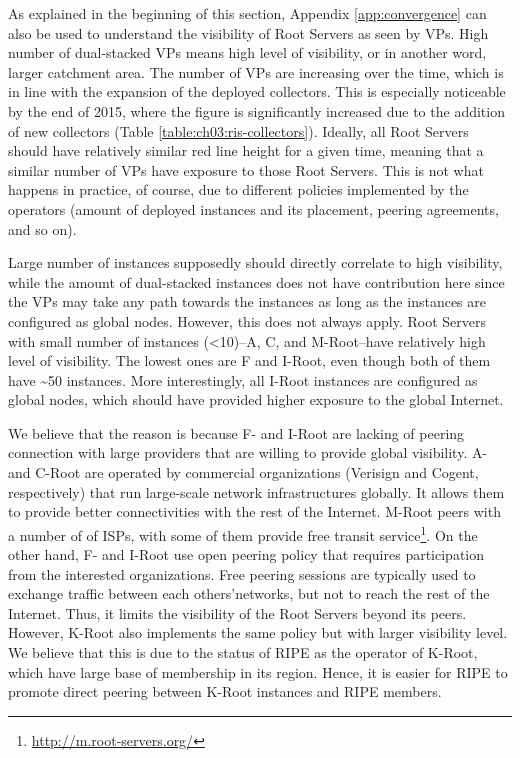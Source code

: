 As explained in the beginning of this section, Appendix \ref{app:convergence} can also be used to understand the visibility of Root Servers as seen by VPs. %
High number of dual-stacked VPs means high level of visibility, or in another word, larger catchment area. The number of VPs are increasing over the time, which is in line with the expansion of the deployed collectors. This is especially noticeable by the end of 2015, where the figure is significantly increased due to the addition of new collectors (Table \ref{table:ch03:ris-collectors}). Ideally, all Root Servers should have relatively similar red line height for a given time, meaning that a similar number of VPs have exposure to those Root Servers. This is not what happens in practice, of course, due to different policies implemented by the operators (amount of deployed instances and its placement, peering agreements, and so on).  

Large number of instances supposedly should directly correlate to high visibility, while the amount of dual-stacked instances does not have contribution here since the VPs may take any path towards the instances as long as the instances are configured as global nodes. However, this does not always apply. Root Servers with small number of instances (\textless 10)--A, C, and M-Root--have relatively high level of visibility. The lowest ones are F and I-Root, even though both of them have \textasciitilde50 instances. More interestingly, all I-Root instances are configured as global nodes, which should have provided higher exposure to the global Internet. 

We believe that the reason is because F- and I-Root are lacking of peering connection with large providers that are willing to provide global visibility. A- and C-Root are operated by commercial organizations (Verisign and Cogent, respectively) that run large-scale network infrastructures globally. It allows them to provide better connectivities with the rest of the Internet. M-Root peers with a number of of ISPs, with some of them provide free transit service\footnote{\url{http://m.root-servers.org/}}. On the other hand, F- and I-Root use open peering policy that requires participation from the interested organizations. Free peering sessions are typically used to exchange traffic between each others'networks, but not to reach the rest of the Internet. Thus, it limits the visibility of the Root Servers beyond its peers. However, K-Root also implements the same policy but with larger visibility level. We believe that this is due to the status of RIPE as the operator of K-Root, which have large base of membership in its region. Hence, it is easier for RIPE to promote direct peering between K-Root instances and RIPE members.

